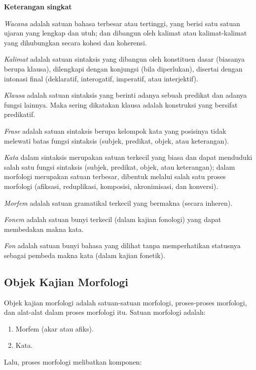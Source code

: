 \textbf{Keterangan singkat}

\textit{Wacana} adalah satuan bahasa terbesar atau tertinggi, yang berisi satu satuan ujaran yang lengkap dan utuh; dan dibangun oleh kalimat atau kalimat-kalimat yang dihubungkan secara kohesi dan koherensi.

\textit{Kalimat} adalah satuan sintaksis yang dibangun oleh konstituen dasar (biasanya berupa klausa), dilengkapi dengan konjungsi (bila diperlukan), disertai dengan intonasi final (deklaratif, interogatif, imperatif, atau interjektif).

\textit{Klausa} adalah satuan sintaksis yang berinti adanya sebuah predikat dan adanya fungsi lainnya. Maka sering dikatakan klausa adalah konstruksi yang bersifat predikatif.

\textit{Frase} adalah satuan sintaksis berupa kelompok kata yang posisinya tidak melewati batas fungsi sintaksis (subjek, predikat, objek, atau keterangan).

\textit{Kata} dalam sintaksis merupakan satuan terkecil yang biasa dan dapat menduduki salah satu fungsi sintaksis (subjek, predikat, objek, atau keterangan); dalam morfologi merupakan satuan terbesar, dibentuk melalui salah satu proses morfologi (afiksasi, reduplikasi, komposisi, akronimisasi, dan konversi).

\textit{Morfem} adalah satuan gramatikal terkecil yang bermakna (secara inheren).

\textit{Fonem} adalah satuan bunyi terkecil (dalam kajian fonologi) yang dapat membedakan makna kata.

\textit{Fon} adalah satuan bunyi bahasa yang dilihat tanpa memperhatikan statusnya sebagai pembeda makna kata (dalam kajian fonetik).


\subsection{Objek Kajian Morfologi}
\label{sec:objekKajianMorfologi}

Objek kajian morfologi adalah satuan-satuan morfologi, proses-proses morfologi, dan alat-alat dalam proses morfologi itu\cite{chaer:08:morfologi}. Satuan morfologi adalah:

\begin{enumerate}
	\item Morfem (akar atau afiks).
	\item Kata.
\end{enumerate}

Lalu, proses morfologi melibatkan komponen:

